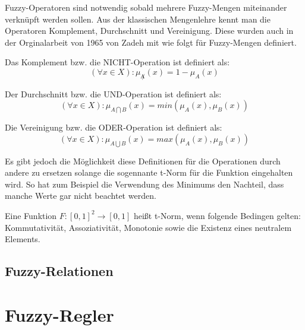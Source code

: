 \documentclass[12pt,a4paper,bibliography=totocnumbered,listof=totocnumbered]{scrartcl}
\theoremstyle{Umgebung}
\begin{document}
Fuzzy-Operatoren sind notwendig sobald mehrere Fuzzy-Mengen miteinander verknüpft werden sollen. Aus der klassischen Mengenlehre kennt man die Operatoren Komplement, Durchschnitt und Vereinigung. Diese wurden auch in der Orginalarbeit von 1965 von Zadeh mit wie folgt für Fuzzy-Mengen definiert.

\begin{defnt}[Komplement]
	Das Komplement bzw. die NICHT-Operation ist definiert als: 
	\begin{equation}
		(\forall x \in X) : \mu_{\not A}( x) = 1 - \mu_A(x)
	\end{equation}
	
\end{defnt}

\begin{defnt}[Durchschnitt]
	Der Durchschnitt bzw. die UND-Operation ist definiert als: 
	\begin{equation}
		(\forall x \in X) : \mu_{A \bigcap B}( x) = min(\mu_A(x),\mu_B(x))
	\end{equation}
\end{defnt}

\begin{defnt}[Vereinigung]
	Die Vereinigung bzw. die ODER-Operation ist definiert als: 
	\begin{equation}
		(\forall x \in X) : \mu_{A \bigcup B}( x) = max(\mu_A(x),\mu_B(x))
	\end{equation}	  
\end{defnt}

Es gibt jedoch die Möglichkeit diese Definitionen für die Operationen durch andere zu ersetzen solange die sogennante t-Norm für die Funktion eingehalten wird. So hat zum Beispiel die Verwendung des Minimums den Nachteil, dass manche Werte gar nicht beachtet werden.

\begin{defnt}
	Eine Funktion $F: \left[0,1\right]^2 \rightarrow \left[0,1\right]$ heißt t-Norm, wenn folgende Bedingen gelten: Kommutativität, Assoziativität, Monotonie sowie die Existenz eines neutralem Elements.
	
\end{defnt}
\subsection{Fuzzy-Relationen}



\section{Fuzzy-Regler}
\end{document}
